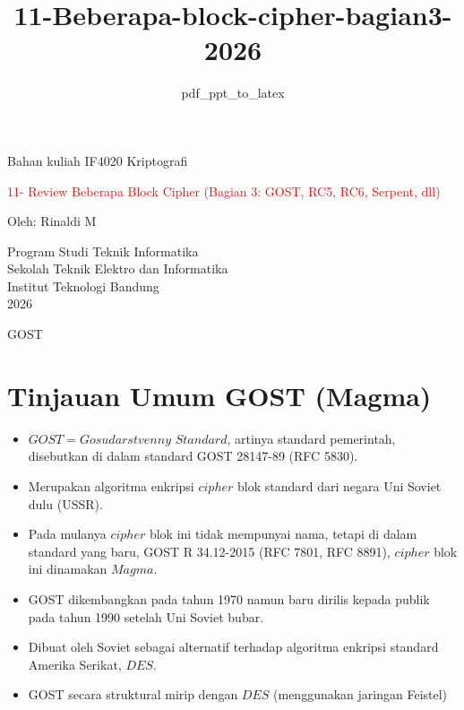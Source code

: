 \documentclass{article}
\title{11-Beberapa-block-cipher-bagian3-2026}
\author{pdf\_ppt\_to\_latex}
\date{}
\begin{document}

\begin{center}
Bahan kuliah IF4020 Kriptografi

\huge \textcolor{red}{11- Review Beberapa Block Cipher}
\large \textcolor{red}{(Bagian 3: GOST, RC5, RC6, Serpent, dll)}

\vspace{20mm}

\large Oleh: Rinaldi M

\vspace{10mm}

Program Studi Teknik Informatika \\
Sekolah Teknik Elektro dan Informatika \\
Institut Teknologi Bandung \\
2026
\end{center}

\newpage


GOST

\newpage


\section*{Tinjauan Umum GOST (Magma)}

\begin{itemize}
    \item $GOST = Gosudarstvenny$ $Standard$, artinya standard pemerintah, disebutkan di dalam standard GOST 28147-89 (RFC 5830).
    \item Merupakan algoritma enkripsi $cipher$ blok standard dari negara Uni Soviet dulu (USSR).
    \item Pada mulanya $cipher$ blok ini tidak mempunyai nama, tetapi di dalam standard yang baru, GOST R 34.12-2015 (RFC 7801, RFC 8891), $cipher$ blok ini dinamakan $Magma$.
    \item GOST dikembangkan pada tahun 1970 namun baru dirilis kepada publik pada tahun 1990 setelah Uni Soviet bubar.
    \item Dibuat oleh Soviet sebagai alternatif terhadap algoritma enkripsi standard Amerika Serikat, $DES$.
    \item GOST secara struktural mirip dengan $DES$ (menggunakan jaringan Feistel)
\end{itemize}
\end{document}
